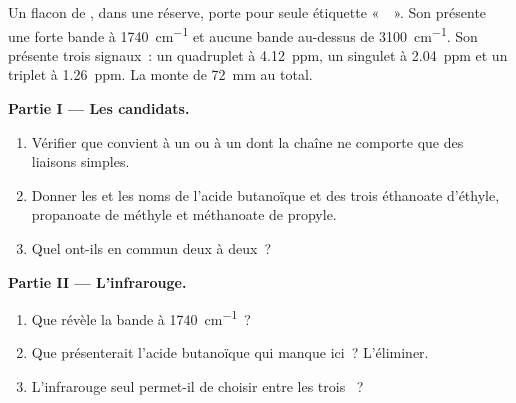 \begin{problem}
\label{pb:g12:proton-nmr:1}
Un flacon de , dans une réserve, porte pour seule étiquette
«~~». Son  présente une forte bande à
\qty{1740}{cm^{-1}} et aucune bande au-dessus de \qty{3100}{cm^{-1}}.
Son  présente trois signaux~: un quadruplet à
\qty{4.12}{ppm}, un singulet à \qty{2.04}{ppm} et un triplet à
\qty{1.26}{ppm}. La  monte de \qty{72}{mm} au total.

\medskip
\noindent\textbf{Partie I --- Les candidats.}
\begin{enumerate}
  \item Vérifier que  convient à un  ou à un  dont la chaîne ne comporte que des liaisons simples.
  \item Donner les  et les noms de l'acide
        butanoïque et des trois  éthanoate d'éthyle, propanoate de
        méthyle et méthanoate de propyle.
  \item Quel  ont-ils en commun deux à deux~?
\end{enumerate}

\medskip
\noindent\textbf{Partie II --- L'infrarouge.}
\begin{enumerate}[resume]
  \item Que révèle la bande à \qty{1740}{cm^{-1}}~?
  \item Que présenterait l'acide butanoïque qui manque ici~? L'éliminer.
  \item L'infrarouge seul permet-il de choisir entre les trois ~?
\end{enumerate}


\end{problem}
